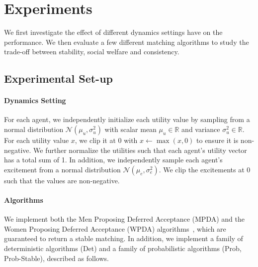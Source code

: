 \section{Experiments}
We first investigate the effect of different dynamics settings have on the performance. We then evaluate a few different matching algorithms to study the trade-off between stability, social welfare and consistency.
\subsection{Experimental Set-up}
\paragraph{Dynamics Setting} For each agent, we independently initialize each utility value by sampling from a normal distribution $\mathcal{N}(\mu_u, \sigma_u^2)$ with scalar mean $\mu_u \in \mathbb{R}$ and variance $\sigma_u^2 \in \mathbb{R}$. For each utility value $x$, we clip it at 0 with $x \leftarrow \max(x, 0)$ to ensure it is non-negative. We further normalize the utilities such that each agent's utility vector has a total sum of 1. In addition, we independently sample each agent's excitement from a normal distribution $\mathcal{N}(\mu_e, \sigma_e^2)$. We clip the excitements at 0 such that the values are non-negative.

\paragraph{Algorithms} We implement both the Men Proposing Deferred Acceptance (MPDA) and the Women Proposing Deferred Acceptance (WPDA) algorithms~\cite{galeshapley1962}, which are guaranteed to return a stable matching. In addition, we implement a family of deterministic algorithms (Det) and a family of probabilistic algorithms (Prob, Prob-Stable), described as follows.

